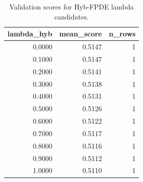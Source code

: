 \begin{table}[t]
\caption{Validation scores for Hyb-FPDE lambda candidates.}
\label{tab:lambda_distribution_computed}
\centering
\begin{tabular}{rrr}
\toprule
lambda\_hyb & mean\_score & n\_rows \\
\midrule
0.0000 & 0.5147 & 1 \\
0.1000 & 0.5147 & 1 \\
0.2000 & 0.5141 & 1 \\
0.3000 & 0.5138 & 1 \\
0.4000 & 0.5131 & 1 \\
0.5000 & 0.5126 & 1 \\
0.6000 & 0.5122 & 1 \\
0.7000 & 0.5117 & 1 \\
0.8000 & 0.5116 & 1 \\
0.9000 & 0.5112 & 1 \\
1.0000 & 0.5110 & 1 \\
\bottomrule
\end{tabular}

\end{table}
